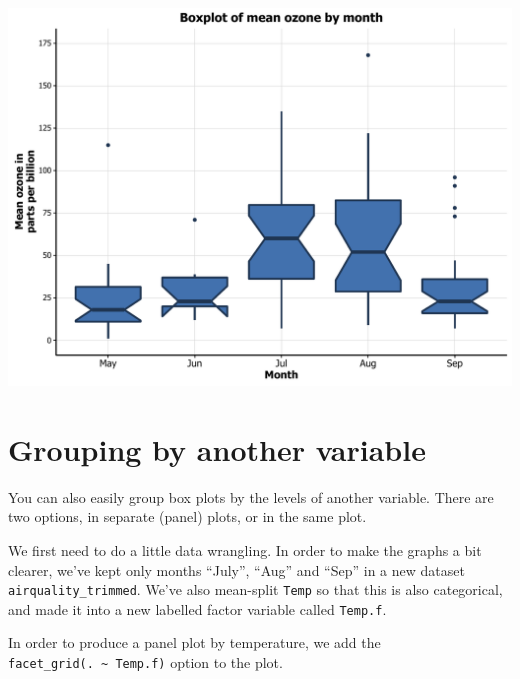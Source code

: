 \begin{center}\includegraphics[width=0.55\linewidth]{figures/box_15-1} \end{center}

\section{Grouping by another
variable}\label{grouping-by-another-variable}

You can also easily group box plots by the levels of another variable.
There are two options, in separate (panel) plots, or in the same plot.

We first need to do a little data wrangling. In order to make the graphs
a bit clearer, we've kept only months ``July'', ``Aug'' and ``Sep'' in a
new dataset \texttt{airquality\_trimmed}. We've also mean-split
\texttt{Temp} so that this is also categorical, and made it into a new
labelled factor variable called \texttt{Temp.f}.

In order to produce a panel plot by temperature, we add the
\texttt{facet\_grid(.\ \textasciitilde{}\ Temp.f)} option to the plot.

